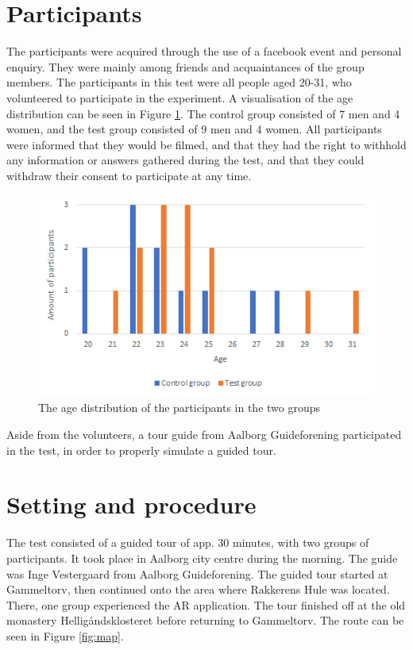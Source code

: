 \section{Participants}
The participants were acquired through the use of a facebook event and personal enquiry. They were mainly among friends and acquaintances of the group members.  
The participants in this test were all people aged 20-31, who volunteered to participate in the experiment. A visualisation of the age distribution can be seen in Figure \ref{fig:age}. The control group consisted of 7 men and 4 women, and the test group consisted of 9 men and 4 women. All participants were informed that they would be filmed, and that they had the right to withhold any information or answers gathered during the test, and that they could withdraw their consent to participate at any time.

\begin{figure}[h!]
  \centering
  \includegraphics[scale=0.8]{figures/agedistribution.png}
  \caption{The age distribution of the participants in the two groups}\label{fig:age}
\end{figure}

Aside from the volunteers, a tour guide from Aalborg Guideforening participated in the test, in order to properly simulate a guided tour.

\section{Setting and procedure}
The test consisted of a guided tour of app. 30 minutes, with two groups of participants. It took place in Aalborg city centre during the morning. The guide was Inge Vestergaard from Aalborg Guideforening. The guided tour started at Gammeltorv, then continued onto the area where Rakkerens Hule was located. There, one group experienced the AR application. The tour finished off at the old monastery Helligåndsklosteret before returning to Gammeltorv. The route can be seen in Figure \ref{fig:map}. 

